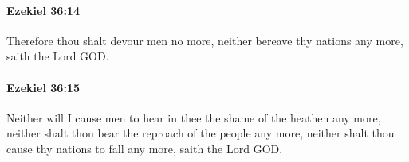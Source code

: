 		\paragraph{Ezekiel 36:14} %
			\label{EZEKIEL-36-14}

			Therefore thou shalt devour men no more, neither bereave thy nations any more, saith the Lord GOD.


		\paragraph{Ezekiel 36:15} %
			\label{EZEKIEL-36-15}

			Neither will I cause men to hear in thee the shame of the heathen any more, neither shalt thou bear the reproach of the people any more, neither shalt thou cause thy nations to fall any more, saith the Lord GOD.


